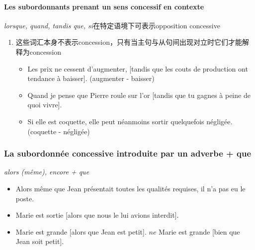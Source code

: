 \documentclass[UTF8]{report}
\begin{document}
\paragraph{Les subordonnants prenant un sens concessif en contexte}
\textit{lorsque, quand, tandis que, si}在特定语境下可表示opposition concessive 
\begin{enumerate}
    \item 这些词汇本身不表示concession，只有当主句与从句间出现对立时它们才能解释为concession
    \begin{itemize}
        \item Les prix ne cessent d’augmenter, [tandis que les couts de production ont tendance à baisser]. (augmenter - baisser)
        \item Quand je pense que Pierre roule sur l’or [tandis que tu gagnes à peine de quoi vivre].
        \item Si elle est coquette, elle peut néanmoins sortir quelquefois négligée. (coquette - négligée)
    \end{itemize}
\end{enumerate}



\subsubsection{La subordonnée concessive introduite par un adverbe + que}
\textit{alors (même), encore + que}
\begin{itemize}
    \item Alors même que Jean présentait toutes les qualités requises, il n’a pas eu le poste.
    \item Marie est sortie [alors que nous le lui avions interdit].
    \item Marie est grande [alors que Jean est petit]. $ne$ Marie est grande [bien que Jean soit petit].
\end{itemize}
\end{document}
